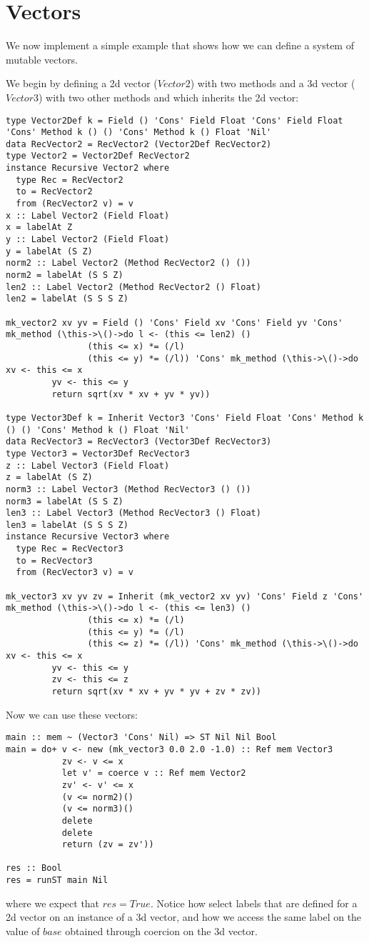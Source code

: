 \section{Vectors}
We now implement a simple example that shows how we can define a system of mutable vectors.

We begin by defining a 2d vector ($Vector2$) with two methods and a 3d vector ($Vector3$) with two other methods and which inherits the 2d vector:
\begin{lstlisting}
type Vector2Def k = Field () 'Cons' Field Float 'Cons' Field Float 'Cons' Method k () () 'Cons' Method k () Float 'Nil'
data RecVector2 = RecVector2 (Vector2Def RecVector2)
type Vector2 = Vector2Def RecVector2
instance Recursive Vector2 where
  type Rec = RecVector2
  to = RecVector2
  from (RecVector2 v) = v
x :: Label Vector2 (Field Float)
x = labelAt Z
y :: Label Vector2 (Field Float)
y = labelAt (S Z)
norm2 :: Label Vector2 (Method RecVector2 () ())
norm2 = labelAt (S S Z)
len2 :: Label Vector2 (Method RecVector2 () Float)
len2 = labelAt (S S S Z)

mk_vector2 xv yv = Field () 'Cons' Field xv 'Cons' Field yv 'Cons' mk_method (\this->\()->do l <- (this <= len2) ()
                (this <= x) *= (/l)
                (this <= y) *= (/l)) 'Cons' mk_method (\this->\()->do xv <- this <= x
         yv <- this <= y
         return sqrt(xv * xv + yv * yv))

type Vector3Def k = Inherit Vector3 'Cons' Field Float 'Cons' Method k () () 'Cons' Method k () Float 'Nil'
data RecVector3 = RecVector3 (Vector3Def RecVector3)
type Vector3 = Vector3Def RecVector3
z :: Label Vector3 (Field Float)
z = labelAt (S Z)
norm3 :: Label Vector3 (Method RecVector3 () ())
norm3 = labelAt (S S Z)
len3 :: Label Vector3 (Method RecVector3 () Float)
len3 = labelAt (S S S Z)
instance Recursive Vector3 where
  type Rec = RecVector3
  to = RecVector3
  from (RecVector3 v) = v

mk_vector3 xv yv zv = Inherit (mk_vector2 xv yv) 'Cons' Field z 'Cons' mk_method (\this->\()->do l <- (this <= len3) ()
                (this <= x) *= (/l)
                (this <= y) *= (/l)
                (this <= z) *= (/l)) 'Cons' mk_method (\this->\()->do xv <- this <= x
         yv <- this <= y
         zv <- this <= z
         return sqrt(xv * xv + yv * yv + zv * zv))
\end{lstlisting}

Now we can use these vectors:
\begin{lstlisting}
main :: mem ~ (Vector3 'Cons' Nil) => ST Nil Nil Bool
main = do+ v <- new (mk_vector3 0.0 2.0 -1.0) :: Ref mem Vector3
           zv <- v <= x
           let v' = coerce v :: Ref mem Vector2
           zv' <- v' <= x
           (v <= norm2)()
           (v <= norm3)()
           delete
           delete
           return (zv = zv'))

res :: Bool
res = runST main Nil
\end{lstlisting}

where we expect that $res=True$. Notice how select labels that are defined for a 2d vector on an instance of a 3d vector, and how we access the same label on the value of $base$ obtained through coercion on the 3d vector.
